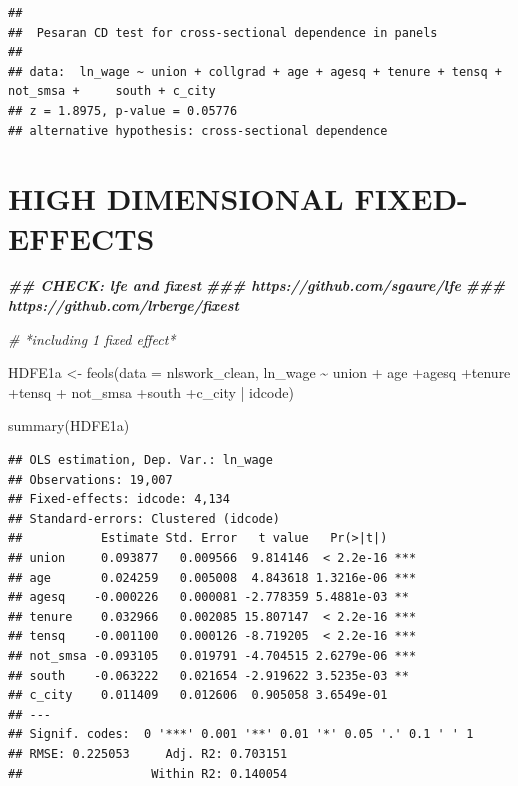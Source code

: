 \documentclass[
]{article}
\newenvironment{Shaded}{\begin{snugshade}}{\end{snugshade}}
\newcommand{\AttributeTok}[1]{\textcolor[rgb]{0.77,0.63,0.00}{#1}}
\newcommand{\CommentTok}[1]{\textcolor[rgb]{0.56,0.35,0.01}{\textit{#1}}}
\newcommand{\DocumentationTok}[1]{\textcolor[rgb]{0.56,0.35,0.01}{\textbf{\textit{#1}}}}
\newcommand{\FunctionTok}[1]{\textcolor[rgb]{0.00,0.00,0.00}{#1}}
\newcommand{\NormalTok}[1]{#1}
\newcommand{\OtherTok}[1]{\textcolor[rgb]{0.56,0.35,0.01}{#1}}
\newcommand{\SpecialCharTok}[1]{\textcolor[rgb]{0.00,0.00,0.00}{#1}}
\begin{document}
\begin{verbatim}
## 
##  Pesaran CD test for cross-sectional dependence in panels
## 
## data:  ln_wage ~ union + collgrad + age + agesq + tenure + tensq + not_smsa +     south + c_city
## z = 1.8975, p-value = 0.05776
## alternative hypothesis: cross-sectional dependence
\end{verbatim}

\hypertarget{high-dimensional-fixed-effects}{%
\section{HIGH DIMENSIONAL
FIXED-EFFECTS}\label{high-dimensional-fixed-effects}}

\begin{Shaded}
\begin{Highlighting}[]
\DocumentationTok{\#\# CHECK: \textquotesingle{}lfe\textquotesingle{} and \textquotesingle{}fixest\textquotesingle{}}
\DocumentationTok{\#\#\# https://github.com/sgaure/lfe}
\DocumentationTok{\#\#\# https://github.com/lrberge/fixest}

\CommentTok{\# *including 1 fixed effect*}

\NormalTok{  HDFE1a }\OtherTok{\textless{}{-}} \FunctionTok{feols}\NormalTok{(}\AttributeTok{data =}\NormalTok{ nlswork\_clean, ln\_wage }\SpecialCharTok{\textasciitilde{}}\NormalTok{ union }\SpecialCharTok{+}
\NormalTok{                    age }\SpecialCharTok{+}\NormalTok{agesq }\SpecialCharTok{+}\NormalTok{tenure }\SpecialCharTok{+}\NormalTok{tensq }\SpecialCharTok{+}
\NormalTok{                    not\_smsa }\SpecialCharTok{+}\NormalTok{south }\SpecialCharTok{+}\NormalTok{c\_city }\SpecialCharTok{|}\NormalTok{ idcode)}
  
      \FunctionTok{summary}\NormalTok{(HDFE1a)}
\end{Highlighting}
\end{Shaded}

\begin{verbatim}
## OLS estimation, Dep. Var.: ln_wage
## Observations: 19,007 
## Fixed-effects: idcode: 4,134
## Standard-errors: Clustered (idcode) 
##           Estimate Std. Error   t value   Pr(>|t|)    
## union     0.093877   0.009566  9.814146  < 2.2e-16 ***
## age       0.024259   0.005008  4.843618 1.3216e-06 ***
## agesq    -0.000226   0.000081 -2.778359 5.4881e-03 ** 
## tenure    0.032966   0.002085 15.807147  < 2.2e-16 ***
## tensq    -0.001100   0.000126 -8.719205  < 2.2e-16 ***
## not_smsa -0.093105   0.019791 -4.704515 2.6279e-06 ***
## south    -0.063222   0.021654 -2.919622 3.5235e-03 ** 
## c_city    0.011409   0.012606  0.905058 3.6549e-01    
## ---
## Signif. codes:  0 '***' 0.001 '**' 0.01 '*' 0.05 '.' 0.1 ' ' 1
## RMSE: 0.225053     Adj. R2: 0.703151
##                  Within R2: 0.140054
\end{verbatim}
\end{document}
